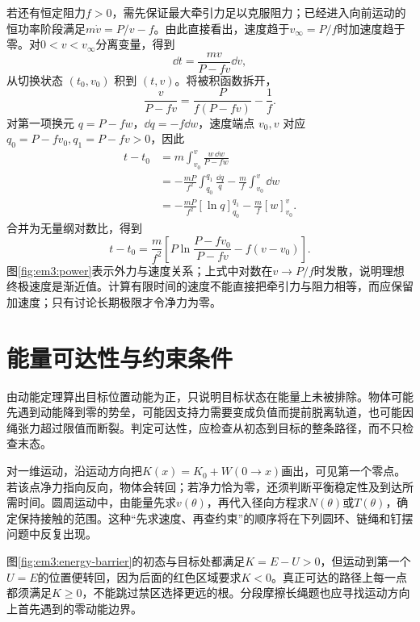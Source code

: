 若还有恒定阻力$f>0$，需先保证最大牵引力足以克服阻力；已经进入向前运动的恒功率阶段满足$m\dot v=P/v-f$。由此直接看出，速度趋于$v_{\infty}=P/f$时加速度趋于零。对$0<v<v_{\infty}$分离变量，得到
\[\dd t=\frac{mv}{P-fv}\dd v,\]
从切换状态 $(t_0,v_0)$ 积到 $(t,v)$。将被积函数拆开，
\[
\frac{v}{P-fv}=\frac{P}{f(P-fv)}-\frac1f.
\]
对第一项换元 $q=P-fw$，$\dd q=-f\dd w$，速度端点 $v_0,v$ 对应 $q_0=P-fv_0,q_1=P-fv>0$，因此
\begin{align*}
t-t_0
&=m\int_{v_0}^v\frac{w\,\dd w}{P-fw}\\
&=-\frac{mP}{f^2}\int_{q_0}^{q_1}\frac{\dd q}{q}
-\frac mf\int_{v_0}^v\dd w\\
&=-\frac{mP}{f^2}[\ln q]_{q_0}^{q_1}-\frac mf[w]_{v_0}^v.
\end{align*}
合并为无量纲对数比，得到
\[t-t_0=\frac{m}{f^2}\left[P\ln\frac{P-fv_0}{P-fv}-f(v-v_0)\right].\]
图\ref{fig:em3:power}表示外力与速度关系；上式中对数在$v\to P/f$时发散，说明理想终极速度是渐近值。计算有限时间的速度不能直接把牵引力与阻力相等，而应保留加速度；只有讨论长期极限才令净力为零。
\section{能量可达性与约束条件}

由动能定理算出目标位置动能为正，只说明目标状态在能量上未被排除。物体可能先遇到动能降到零的势垒，可能因支持力需要变成负值而提前脱离轨道，也可能因绳张力超过限值而断裂。判定可达性，应检查从初态到目标的整条路径，而不只检查末态。

对一维运动，沿运动方向把$K(x)=K_0+W(0\to x)$画出，可见第一个零点。若该点净力指向反向，物体会转回；若净力恰为零，还须判断平衡稳定性及到达所需时间。圆周运动中，由能量先求$v(\theta)$，再代入径向方程求$N(\theta)$或$T(\theta)$，确定保持接触的范围。这种“先求速度、再查约束”的顺序将在下列圆环、链绳和钉摆问题中反复出现。

图\ref{fig:em3:energy-barrier}的初态与目标处都满足$K=E-U>0$，但运动到第一个$U=E$的位置便转回，因为后面的红色区域要求$K<0$。真正可达的路径上每一点都须满足$K\ge0$，不能跳过禁区选择更远的根。分段摩擦长绳题也应寻找运动方向上首先遇到的零动能边界。


